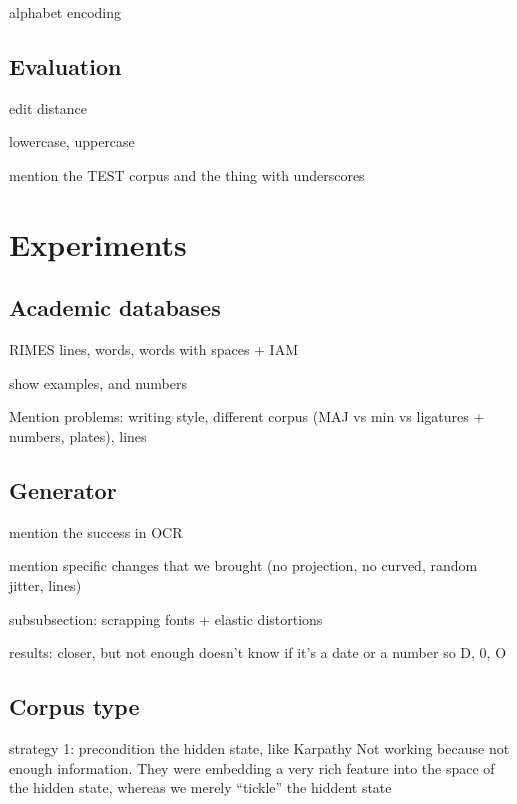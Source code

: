 		alphabet encoding



	\subsection{Evaluation}
		edit distance

		lowercase, uppercase

		mention the TEST corpus and the thing with underscores


\section{Experiments}\label{sec:transcription_experiments}


	\subsection{Academic databases}
		RIMES lines, words, words with spaces + IAM

		show examples, and numbers

		Mention problems: writing style, different corpus (MAJ vs min vs ligatures + numbers, plates), lines


	\subsection{Generator}

		mention the success in OCR

		mention specific changes that we brought (no projection, no curved, random jitter, lines)

		subsubsection: scrapping fonts + elastic distortions

		results:  closer, but not enough doesn't know if it's a date or a number so D, 0, O


	\subsection{Corpus type}
		strategy 1: precondition the hidden state, like Karpathy
		Not working because not enough information. They were embedding a very rich feature into the space of the hidden state, whereas we merely ``tickle'' the hiddent state

